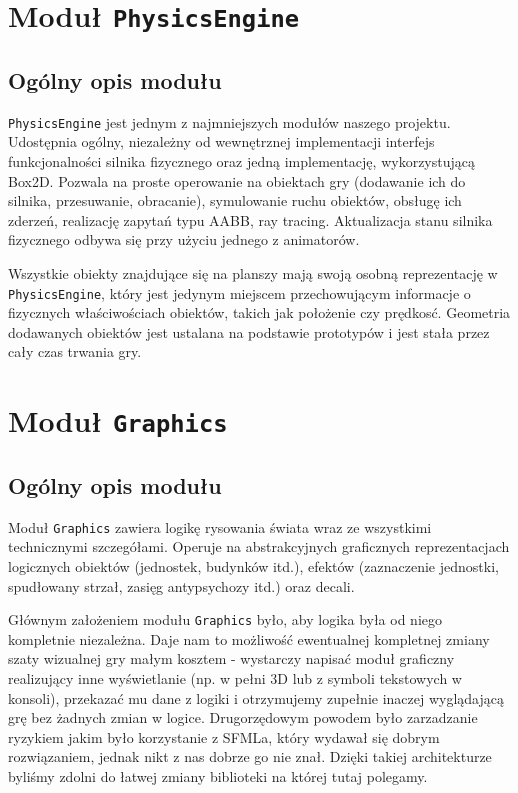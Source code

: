 \documentclass[licencjacka]{pracamgr}
\begin{document}
  \section{Moduł \texttt{PhysicsEngine}}
    \subsection{Ogólny opis modułu}
    \texttt{PhysicsEngine} jest jednym z najmniejszych modułów naszego projektu. Udostępnia ogólny, niezależny od
    wewnętrznej implementacji interfejs funkcjonalności silnika fizycznego oraz jedną implementację, wykorzystującą Box2D.
    Pozwala na proste operowanie na obiektach gry (dodawanie ich do silnika, przesuwanie, obracanie), symulowanie ruchu obiektów,
    obsługę ich zderzeń, realizację zapytań typu AABB, ray tracing. Aktualizacja stanu silnika fizycznego odbywa się przy użyciu jednego
    z animatorów.

    Wszystkie obiekty znajdujące się na planszy mają swoją osobną reprezentację w \texttt{PhysicsEngine}, który jest jedynym miejscem
    przechowującym informacje o fizycznych właściwościach obiektów, takich jak położenie czy prędkosć. Geometria dodawanych obiektów
    jest ustalana na podstawie prototypów i jest stała przez cały czas trwania gry.
  \section{Moduł \texttt{Graphics}}
    \subsection{Ogólny opis modułu}
      Moduł \texttt{Graphics} zawiera logikę rysowania świata wraz ze wszystkimi technicznymi szczegółami. Operuje na
      abstrakcyjnych graficznych reprezentacjach logicznych obiektów (jednostek, budynków itd.), efektów (zaznaczenie
      jednostki, spudłowany strzał, zasięg antypsychozy itd.) oraz decali.

      Głównym założeniem modułu \texttt{Graphics} było, aby logika była od niego kompletnie niezależna. Daje nam to możliwość
      ewentualnej kompletnej zmiany szaty wizualnej gry małym kosztem - wystarczy napisać moduł graficzny realizujący
      inne wyświetlanie (np. w pełni 3D lub z symboli tekstowych w konsoli), przekazać mu dane z logiki i otrzymujemy
      zupełnie inaczej wyglądającą grę bez żadnych zmian w logice. Drugorzędowym powodem było zarzadzanie ryzykiem jakim
      było korzystanie z SFMLa, który wydawał się dobrym rozwiązaniem, jednak nikt z nas dobrze go nie znał. Dzięki
      takiej architekturze byliśmy zdolni do łatwej zmiany biblioteki na której tutaj polegamy.
\end{document}
